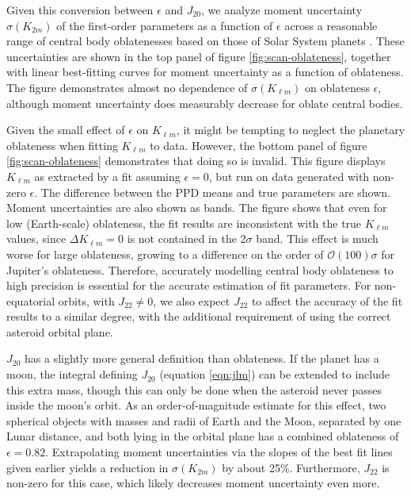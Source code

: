 \documentclass[fleqn,usenatbib]{mnras}
\begin{document}
Given this conversion between $\epsilon$ and $J_{20}$, we analyze moment uncertainty $\sigma(K_{2 m})$ of the first-order parameters as a function of $\epsilon$ across a reasonable range of central body oblatenesses based on those of Solar System planets \cite{paterLissauer2015}. These uncertainties are shown in the top panel of figure \ref{fig:scan-oblateness}, together with linear best-fitting curves for moment uncertainty as a function of oblateness. The figure demonstrates almost no dependence of $\sigma(K_{\ell m})$ on oblateness $\epsilon$, although moment uncertainty does measurably decrease for oblate central bodies.

Given the small effect of $\epsilon$ on $K_{\ell m}$, it might be tempting to neglect the planetary oblateness when fitting $K_{\ell m}$ to data. However, the bottom panel of figure \ref{fig:scan-oblateness} demonstrates that doing so is invalid. This figure displays $K_{\ell m}$ as extracted by a fit assuming $\epsilon = 0$, but run on data generated with non-zero $\epsilon$. The difference between the PPD means and true parameters are shown. Moment uncertainties are also shown as bands. The figure shows that even for low (Earth-scale) oblateness, the fit results are inconsistent with the true $K_{\ell m}$ values, since $\Delta K_{\ell m} = 0$ is not contained in the 2$\sigma$ band. This effect is much worse for large oblateness, growing to a difference on the order of $\mathcal{O}(100)\sigma$ for Jupiter's oblateness. Therefore, accurately modelling central body oblateness to high precision is essential for the accurate estimation of fit parameters. For non-equatorial orbits, with $J_{22} \neq 0$, we also expect $J_{22}$ to affect the accuracy of the fit results to a similar degree, with the additional requirement of using the correct asteroid orbital plane.

$J_{20}$ has a slightly more general definition than oblateness. If the planet has a moon, the integral defining $J_{20}$ (equation \ref{eqn:jlm}) can be extended to include this extra mass, though this can only be done when the asteroid never passes inside the moon's orbit. As an order-of-magnitude estimate for this effect, two spherical objects with masses and radii of Earth and the Moon, separated by one Lunar distance, and both lying in the orbital plane has a combined oblateness of $\epsilon = 0.82$. Extrapolating moment uncertainties via the slopes of the best fit lines given earlier yields a reduction in $\sigma(K_{2m})$ by about 25\%. Furthermore, $J_{22}$ is non-zero for this case, which likely decreases moment uncertainty even more.
\end{document}
